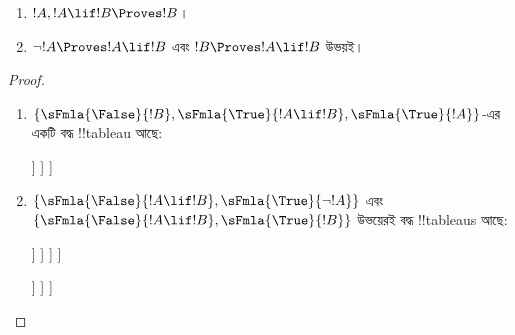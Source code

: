 \documentclass[../../../include/open-logic-section]{subfiles}
\begin{document}
\begin{prop}
  \begin{enumerate}
  \item {}
    $!A, !A \lif !B \Proves !B$।
  \item {}
    $\lnot !A \Proves !A \lif !B$ এবং $!B \Proves !A \lif !B$
    উভয়ই।
  \end{enumerate}
\end{prop}

\begin{proof}
  \begin{enumerate}
    \item $\{\sFmla{\False}{!B}, \sFmla{\True}{!A \lif !B},
      \sFmla{\True}{!A}\}$-এর একটি বদ্ধ !!{tableau} আছে:
      \begin{oltableau}
        [\sFmla{\False}{\formula{B}}, just=\TAss
          [\sFmla{\True}{\formula{A} \lif \formula{B}}, just=\TAss
            [\sFmla{\True}{\formula{A}}, just=\TAss
              [\sFmla{\False}{\formula{A}}, just = {\TRule{\True}{\lif}[2]}, close]
              [\sFmla{\True}{\formula{B}}, just = {\TRule{\True}{\lif}[2]}, close]
            ]
          ]
        ]
      \end{oltableau}
    \item $\{\sFmla{\False}{!A \lif !B},
      \sFmla{\True}{\lnot !A}\}$ এবং $\{\sFmla{\False}{!A \lif !B},
      \sFmla{\True}{!B}\}$ উভয়েরই বদ্ধ !!{tableau}s আছে:
      \begin{oltableau}
        [\sFmla{\False}{\formula{A} \lif \formula{B}}, just = \TAss
          [\sFmla{\True}{\lnot \formula{A}}, just = \TAss
            [\sFmla{\True}{\formula{A}}, just = {\TRule{\False}{\lif}[1]}
              [\sFmla{\False}{\formula{B}}, just = {\TRule{\False}{\lif}[1]}
                [\sFmla{\False}{\formula{A}}, just = {\TRule{\True}{\lnot}[2]}, close]
              ]
            ]
          ]
        ]
      \end{oltableau}
      \begin{oltableau}
        [\sFmla{\False}{\formula{A} \lif \formula{B}}, just = \TAss
          [\sFmla{\True}{\formula{B}}, just = \TAss
            [\sFmla{\True}{\formula{A}}, just = {\TRule{\False}{\lif}[1]}
              [\sFmla{\False}{\formula{B}}, just = {\TRule{\False}{\lif}[1]},close
              ]
            ]
          ]
        ]
      \end{oltableau}
  \end{enumerate}
\end{proof}
\end{document}
